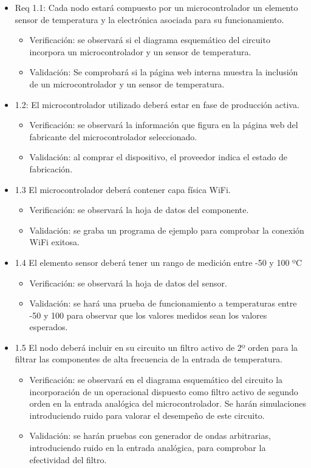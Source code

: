 \documentclass[11pt]{charter}
\begin{document}
\begin{itemize} 
\item Req 1.1: Cada nodo estará compuesto por un microcontrolador un elemento sensor de
temperatura y la electrónica asociada para su funcionamiento.
	\begin{itemize}
	\item Verificación: se observará si el diagrama esquemático del circuito incorpora un microcontrolador y un sensor de temperatura.
	\item Validación: Se comprobará si la página web interna muestra la inclusión de un microcontrolador y un sensor de temperatura.
\end{itemize}

\item 1.2: El microcontrolador utilizado deberá estar en fase de producción activa.
\begin{itemize}
\item Verificación: se observará la información que figura en la página web del fabricante del microcontrolador seleccionado.
\item Validación: al comprar el dispositivo, el proveedor indica el estado de fabricación.
\end{itemize}

\item 1.3 El microcontrolador deberá contener capa física WiFi.

\begin{itemize}
\item Verificación: se observará la hoja de datos del componente.
\item Validación: se graba un programa de ejemplo para comprobar la conexión WiFi exitosa.
\end{itemize}


\item 1.4 El elemento sensor deberá tener un rango de medición entre -50 y 100 ºC
\begin{itemize}
\item Verificación: se observará la hoja de datos del sensor.
\item Validación: se hará una prueba de funcionamiento a temperaturas entre -50 y 100 para observar que los valores medidos sean los valores esperados.
\end{itemize}


\item 1.5 El nodo deberá incluir en su circuito un filtro activo de 2º orden para la filtrar las componentes de alta frecuencia de la entrada de temperatura.
\begin{itemize}
\item Verificación: se observará en el diagrama esquemático del circuito la incorporación de un operacional dispuesto como filtro activo de segundo orden en la entrada analógica del microcontrolador. Se harán simulaciones introduciendo ruido para valorar el desempeño de este circuito.
\item Validación: se harán pruebas con generador de ondas arbitrarias, introduciendo ruido en la entrada analógica, para comprobar la efectividad del filtro.
\end{itemize}


\end{itemize}
\end{document}
